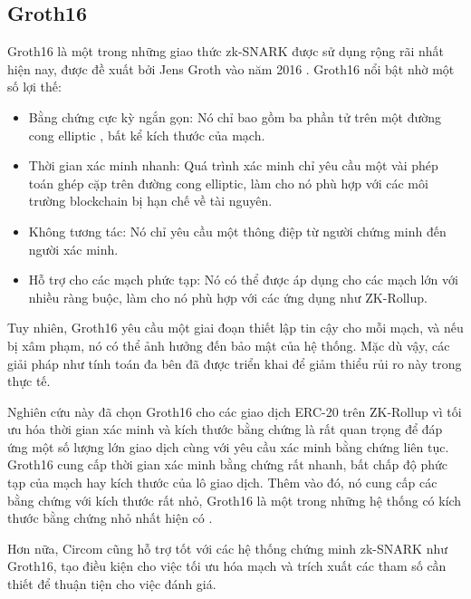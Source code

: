 \subsection{Groth16}
Groth16 là một trong những giao thức zk-SNARK được sử dụng rộng rãi nhất hiện nay, được đề xuất bởi Jens Groth vào năm 2016 \cite{groth2016size}. Groth16 nổi bật nhờ một số lợi thế:
\begin{itemize}
    \item Bằng chứng cực kỳ ngắn gọn: Nó chỉ bao gồm ba phần tử trên một đường cong elliptic \cite{zhu2025extending}, bất kể kích thước của mạch.
    \item Thời gian xác minh nhanh: Quá trình xác minh chỉ yêu cầu một vài phép toán ghép cặp trên đường cong elliptic, làm cho nó phù hợp với các môi trường blockchain bị hạn chế về tài nguyên.
    \item Không tương tác: Nó chỉ yêu cầu một thông điệp từ người chứng minh đến người xác minh.
    \item Hỗ trợ cho các mạch phức tạp: Nó có thể được áp dụng cho các mạch lớn với nhiều ràng buộc, làm cho nó phù hợp với các ứng dụng như ZK-Rollup.
\end{itemize}

Tuy nhiên, Groth16 yêu cầu một giai đoạn thiết lập tin cậy cho mỗi mạch, và nếu bị xâm phạm, nó có thể ảnh hưởng đến bảo mật của hệ thống. Mặc dù vậy, các giải pháp như tính toán đa bên đã được triển khai để giảm thiểu rủi ro này trong thực tế.

Nghiên cứu này đã chọn Groth16 cho các giao dịch ERC-20 trên ZK-Rollup vì tối ưu hóa thời gian xác minh và kích thước bằng chứng là rất quan trọng để đáp ứng một số lượng lớn giao dịch cùng với yêu cầu xác minh bằng chứng liên tục. Groth16 cung cấp thời gian xác minh bằng chứng rất nhanh, bất chấp độ phức tạp của mạch hay kích thước của lô giao dịch. Thêm vào đó, nó cung cấp các bằng chứng với kích thước rất nhỏ, Groth16 là một trong những hệ thống có kích thước bằng chứng nhỏ nhất hiện có \cite{partala2020non}.

Hơn nữa, Circom cũng hỗ trợ tốt với các hệ thống chứng minh zk-SNARK như Groth16, tạo điều kiện cho việc tối ưu hóa mạch và trích xuất các tham số cần thiết để thuận tiện cho việc đánh giá.

